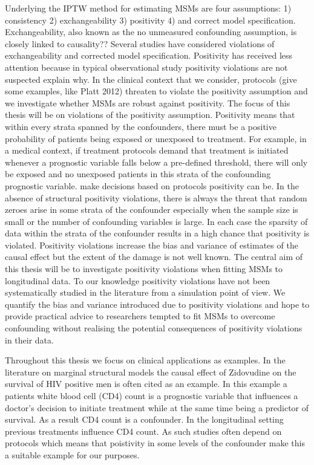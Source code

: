 \documentclass[11pt]{article}
\begin{document}
Underlying the IPTW method for estimating MSMs are four assumptions: 1)
consistency 2) exchangeability 3) positivity 4) and correct model
specification. Exchangeability, also known as the no unmeasured
confounding assumption, is closely linked to causality?? Several studies
have considered violations of exchangeability and corrected model
specification. Positivity has received less attention because in typical
observational study positivity violations are not suspected explain why.
In the clinical context that we consider, protocols (give some examples,
like Platt 2012) threaten to violate the positivity assumption and we
investigate whether MSMs are robust against positivity. The focus of
this thesis will be on violations of the positivity assumption.
Positivity means that within every strata spanned by the confounders,
there must be a positive probability of patients being exposed or
unexposed to treatment. For example, in a medical context, if treatment
protocols demand that treatment is initiated whenever a prognostic
variable falls below a pre-defined threshold, there will only be exposed
and no unexposed patients in this strata of the confounding prognostic
variable. make decisions based on protocols positivity can be. In the
absence of structural positivity violations, there is always the threat
that random zeroes arise in some strata of the confounder especially
when the sample size is small or the number of confounding variables is
large. In each case the sparsity of data within the strata of the
confounder results in a high chance that positivity is violated.
Positivity violations increase the bias and variance of estimates of the
causal effect but the extent of the damage is not well known. The
central aim of this thesis will be to investigate positivity violations
when fitting MSMs to longitudinal data. To our knowledge positivity
violations have not been systematically studied in the literature from a
simulation point of view. We quantify the bias and variance introduced
due to positivity violations and hope to provide practical advice to
researchers tempted to fit MSMs to overcome confounding without
realising the potential consequences of positivity violations in their
data. \linebreak

Throughout this thesis we focus on clinical applications as examples. In
the literature on marginal structural models the causal effect of
Zidovudine on the survival of HIV positive men is often cited as an
example. In this example a patients white blood cell (CD4) count is a
prognostic variable that influences a doctor's decision to initiate
treatment while at the same time being a predictor of survival. As a
result CD4 count is a confounder. In the longitudinal setting previous
treatments influence CD4 count. As such studies often depend on
protocols which means that poistivity in some levels of the confounder
make this a suitable example for our purposes. \linebreak 
\end{document}
